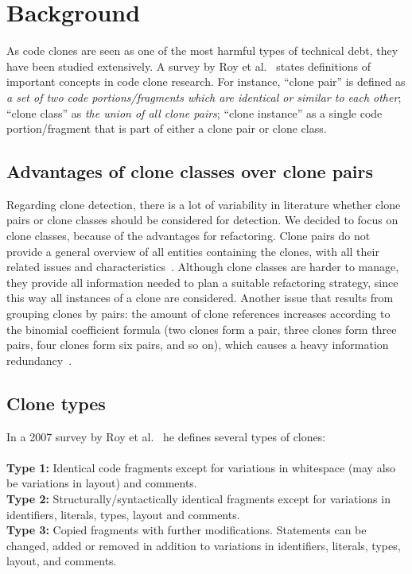 \documentclass[a4paper]{article}
\begin{document}
\section{Background}\label{chap:background}
As code clones are seen as one of the most harmful types of technical debt, they have been studied extensively. A survey by Roy et al.~\cite{roy2007survey} states definitions of important concepts in code clone research. For instance, ``clone pair'' is defined as \textit{a set of two code portions/fragments which are identical or similar to each other}; ``clone class'' as \textit{the union of all clone pairs}; ``clone instance'' as a single code portion/fragment that is part of either a clone pair or clone class.

\subsection{Advantages of clone classes over clone pairs}\label{chap:cloneclasses}
Regarding clone detection, there is a lot of variability in literature whether clone pairs or clone classes should be considered for detection. We decided to focus on clone classes, because of the advantages for refactoring. Clone pairs do not provide a general overview of all entities containing the clones, with all their related issues and characteristics~\cite{fontana2012duplicated}. Although clone classes are harder to manage, they provide all information needed to plan a suitable refactoring strategy, since this way all instances of a clone are considered. Another issue that results from grouping clones by pairs: the amount of clone references increases according to the binomial coefficient formula (two clones form a pair, three clones form three pairs, four clones form six pairs, and so on), which causes a heavy information redundancy~\cite{fontana2012duplicated}.

\subsection{Clone types}\label{chap:backgroundclonetypes}
In a 2007 survey by Roy et al.~\cite{roy2007survey} he defines several types of clones:
\\\\
\textbf{Type 1:} Identical code fragments except for variations in whitespace (may also be variations in layout) and comments.\\
\textbf{Type 2:} Structurally/syntactically identical fragments except for variations in identifiers, literals, types, layout and comments.\\
\textbf{Type 3:} Copied fragments with further modifications. Statements can be changed, added or removed in addition to variations in identifiers, literals, types, layout, and comments.\\
\end{document}
